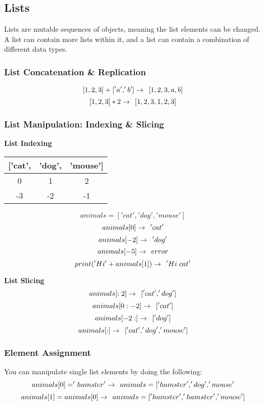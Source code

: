 \newpage
\subsection{Lists}
Lists are mutable sequences of objects, meaning the list elements can be changed. A list can contain more lists within it, and a list can contain a combination of different data types.

\subsubsection{List Concatenation \& Replication}
\[[1,2,3] + ['a','b'] \rightarrow \hspace{0.15cm} [1,2,3,a,b]\]
\[[1,2,3] *2 \rightarrow \hspace{0.15cm} [1,2,3,1,2,3]\]

\subsubsection{List Manipulation: Indexing \& Slicing}
\textbf{List Indexing}
\begin{center}
    \begin{tabular}{ c c c }
        ['cat', & 'dog', & 'mouse']  \\
        \hline
        0 & 1 & 2 \\
        -3 & -2 & -1 \\
    \end{tabular}
\end{center}

\[animals = ['cat', 'dog', 'mouse']\]
\[animals[0] \rightarrow \hspace{0.15cm}'cat'\]
\[animals[-2] \rightarrow \hspace{0.15cm}'dog'\]
\[animals[-5] \rightarrow \hspace{0.15cm} error\]
\[print('Hi' + animals[1]) \rightarrow \hspace{0.15cm} 'Hi \hspace{0.1cm} cat'\]

\textbf{List Slicing}
\[animals[:2] \rightarrow \hspace{0.15cm}['cat', 'dog']\]
\[animals[0:-2] \rightarrow \hspace{0.15cm}['cat']\]
\[animals[-2:] \rightarrow \hspace{0.15cm} ['dog']\]
\[animals[:] \rightarrow \hspace{0.15cm} ['cat', 'dog', 'mouse']\]

\subsubsection{Element Assignment}
You can manipulate single list elements by doing the following:
\[animals[0] = 'hamster' \rightarrow \hspace{0.15cm} animals = ['hamster','dog','mouse'\]
\[animals[1] = animals[0] \rightarrow \hspace{0.15cm} animals=['hamster', 'hamster','mouse']\]

